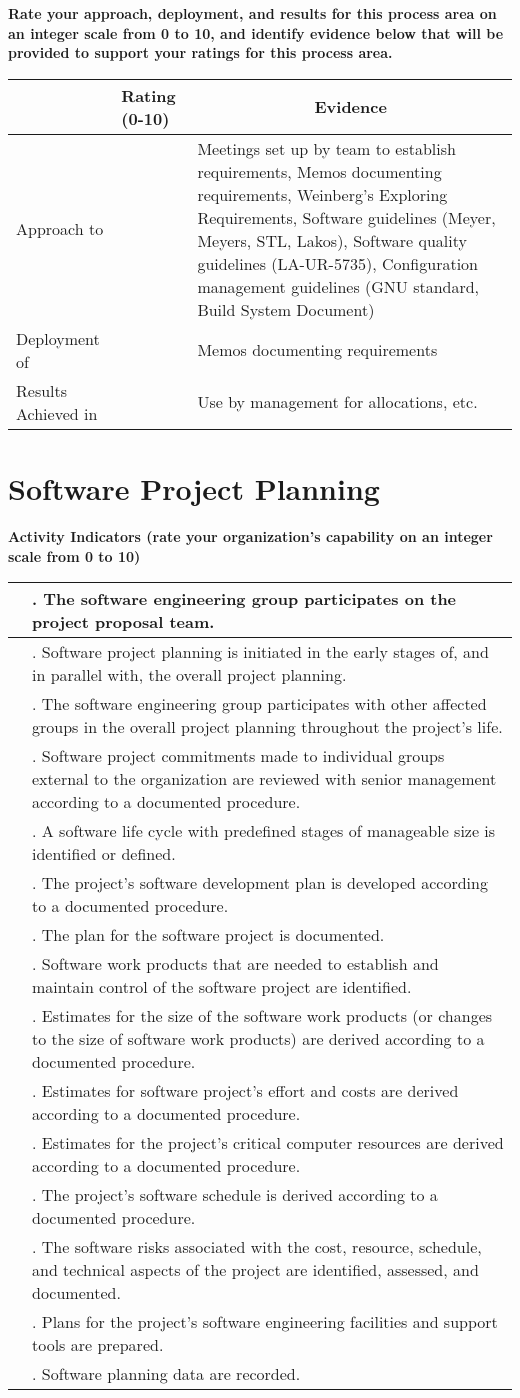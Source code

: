 \documentclass{article}
\newcommand{\KPAname}{}
\let\KPAsection=\section
\renewcommand{\section}[1]{\renewcommand{\KPAname}{#1}\KPAsection{#1}}
\newcounter{activity}[section]		%
\newcounter{approach}[section]
\newcounter{deployment}[section]
\newcounter{result}[section]
\newcounter{score}
\newenvironment{KPAActivity}
{
    {\bf Activity Indicators (rate your organization's capability
    on an integer scale from 0 to 10)} %
    \begin{center}
    \begin{tabular}{|p{0.5in}|p{6.0in}|} \hline %
}
{
    \end{tabular}
    \end{center}
    \setcounter{approach}{\value{approach}/\value{activity}}
    \setcounter{deployment}{\value{deployment}/\value{activity}}
    \setcounter{result}{\value{result}/\value{activity}}
}
\newcommand{\Activity}[4]
{
    \stepcounter{activity} 
    \setcounter{score}{(#1+#2+#3)/3}
    \setcounter{approach}{\value{approach}+#1}
    \setcounter{deployment}{\value{deployment}+#1}
    \setcounter{result}{\value{result}+#1}
    \arabic{score} & \arabic{activity}. #4 \\ \hline
} %
\newenvironment{KPARate}
{
    {\bf Rate your approach, deployment, and results for
    this process area on an integer scale from 0 to 10, and 
    identify evidence below that will be provided to support your
    ratings for this process area.}
    \begin{center}
    \begin{tabular}{|p{1.0in}|p{0.5in}|p{5.0in}|} \hline
    & Rating (0-10) & \multicolumn{1}{c|}{Evidence} \\ \hline
}
{
    \end{tabular}
    \end{center}
}
\newcommand{\Approach}[1]
{
    Approach to \KPAname & \arabic{approach} & #1 \\ \hline
}
\newcommand{\Deployment}[1]
{
    Deployment of \KPAname & \arabic{deployment} & #1 \\ \hline
}
\newcommand{\Results}[1]
{
    Results Achieved in \KPAname & \arabic{result} & #1 \\ \hline
}
\begin{document}
\begin{KPARate}
\Approach{Meetings set up by team to establish requirements, Memos
documenting requirements, Weinberg's Exploring Requirements, Software
guidelines (Meyer, Meyers, STL, Lakos), Software quality guidelines
(LA-UR-5735), Configuration management guidelines (GNU standard, Build
System Document)}
\Deployment{Memos documenting requirements}
\Results{Use by management for allocations, etc.}
\end{KPARate}

\newpage
\section{Software Project Planning}

\begin{KPAActivity}
\Activity{4}{4}{4}{The software engineering group participates on the
project proposal team.}
\Activity{3}{3}{3}{Software project planning is initiated in the early
stages of, and in parallel with, the overall project planning.}
\Activity{3}{3}{3}{The software engineering group participates with other
affected groups in the overall project planning throughout the
project's life.}
\Activity{1}{1}{1}{Software project commitments made to individual groups
external to the organization are reviewed with senior management
according to a documented procedure.}
\Activity{2}{2}{2}{A software life cycle with predefined stages of
manageable size is identified or defined.}
\Activity{3}{3}{3}{The project's software development plan is developed
according to a documented procedure.}
\Activity{3}{3}{3}{The plan for the software project is documented.}
\Activity{3}{3}{3}{Software work products that are needed to establish
and maintain control of the software project are identified.}
\Activity{1}{1}{1}{Estimates for the size of the software work products (or
changes to the size of software work products) are derived according
to a documented procedure.}
\Activity{1}{1}{1}{Estimates for software project's effort and costs are
derived according to a documented procedure.}
\Activity{1}{1}{1}{Estimates for the project's critical computer
resources are derived according to a documented procedure.}
\Activity{2}{2}{2}{The project's software schedule is derived according
to a documented procedure.}
\Activity{0}{0}{0}{The software risks associated with the cost,
resource, schedule, and technical aspects of the project are
identified, assessed, and documented.}
\Activity{1}{1}{1}{Plans for the project's software engineering
facilities and support tools are prepared.}
\Activity{3}{3}{3}{Software planning data are recorded.}
\end{KPAActivity}
\end{document}
